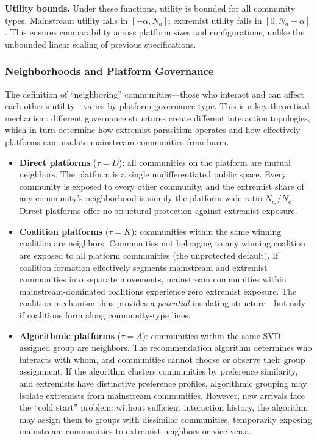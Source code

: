 \documentclass{article}
\begin{document}
\textbf{Utility bounds.} Under these functions, utility is bounded for all community types. Mainstream utility falls in $[-\alpha, N_a]$; extremist utility falls in $[0, N_a + \alpha]$. This ensures comparability across platform sizes and configurations, unlike the unbounded linear scaling of previous specifications.

\subsubsection{Neighborhoods and Platform Governance}
\label{sec:neighborhoods}

The definition of ``neighboring'' communities---those who interact and can affect each other's utility---varies by platform governance type. This is a key theoretical mechanism: different governance structures create different interaction topologies, which in turn determine how extremist parasitism operates and how effectively platforms can insulate mainstream communities from harm.

\begin{itemize}
    \item \textbf{Direct platforms} ($\tau = D$): all communities on the platform are mutual neighbors. The platform is a single undifferentiated public space. Every community is exposed to every other community, and the extremist share of any community's neighborhood is simply the platform-wide ratio $N_{c_e} / N_c$. Direct platforms offer no structural protection against extremist exposure.

    \item \textbf{Coalition platforms} ($\tau = K$): communities within the same winning coalition are neighbors. Communities not belonging to any winning coalition are exposed to all platform communities (the unprotected default). If coalition formation effectively segments mainstream and extremist communities into separate movements, mainstream communities within mainstream-dominated coalitions experience zero extremist exposure. The coalition mechanism thus provides a \textit{potential} insulating structure---but only if coalitions form along community-type lines.

    \item \textbf{Algorithmic platforms} ($\tau = A$): communities within the same SVD-assigned group are neighbors. The recommendation algorithm determines who interacts with whom, and communities cannot choose or observe their group assignment. If the algorithm clusters communities by preference similarity, and extremists have distinctive preference profiles, algorithmic grouping may isolate extremists from mainstream communities. However, new arrivals face the ``cold start'' problem: without sufficient interaction history, the algorithm may assign them to groups with dissimilar communities, temporarily exposing mainstream communities to extremist neighbors or vice versa.
\end{itemize}
\end{document}
